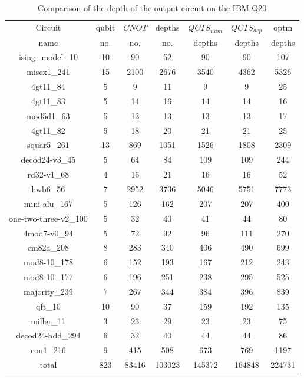 \documentclass[runningheads]{llncs}
\begin{document}
							\begin{table}[H]
								\label{tab8}
								\begin{center}  
								\begin{tabular}{|c|c|c|c|c|c|c|}
								\hline
								Circuit &  qubit  & $CNOT$ &depths &$QCTS_{num}$& $QCTS_{dep}$  & optm 	  	\\
								 name	&   no. 	&	no. & no. & depths&  depths &  depths 	\\
								\hline
								ising\_model\_10 & 10 & 90 & 52 & 90 & 90 & 107 \\
								misex1\_241 & 15 & 2100 & 2676 & 3540 & 4362 & 5326 \\
								4gt11\_84 & 5 & 9 & 11 & 9 & 9 & 25 \\
								4gt11\_83 & 5 & 14 & 16 & 14 & 14 & 16 \\
								mod5d1\_63 & 5 & 13 & 13 & 13 & 13 & 17 \\
								4gt11\_82 & 5 & 18 & 20 & 21 & 21 & 25 \\
								squar5\_261 & 13 & 869 & 1051 & 1526 & 1808 & 2309 \\
								decod24-v3\_45 & 5 & 64 & 84 & 109 & 109 & 244 \\
								rd32-v1\_68 & 4 & 16 & 21 & 16 & 16 & 52 \\
								hwb6\_56 & 7 & 2952 & 3736 & 5046 & 5751 & 7773 \\
								mini-alu\_167 & 5 & 126 & 162 & 207 & 207 & 400 \\
								one-two-three-v2\_100 & 5 & 32 & 40 & 41 & 44 & 80 \\
								4mod7-v0\_94 & 5 & 72 & 92 & 96 & 111 & 270 \\
								cm82a\_208 & 8 & 283 & 340 & 406 & 490 & 699 \\
								mod8-10\_178 & 6 & 152 & 193 & 167 & 212 & 243 \\
								mod8-10\_177 & 6 & 196 & 251 & 238 & 295 & 525 \\
								majority\_239 & 7 & 267 & 344 & 384 & 396 & 839 \\
								qft\_10 & 10 & 90 & 37 & 159 & 192 & 135 \\
								miller\_11 & 3 & 23 & 29 & 23 & 23 & 75 \\
								decod24-bdd\_294 & 6 & 32 & 40 & 44 & 44 & 86 \\
								con1\_216 & 9 & 415 & 508 & 673 & 769 & 1197 \\
								\hline
								total & 823 & 83416 & 103023 & 145372 & 164848 & 224731  \\ 
							\hline
								\end{tabular} 
								\end{center}						
								\caption{Comparison of  the depth of the output circuit on the IBM Q20} 
								\label{tab8}\end{table}
\end{document}
